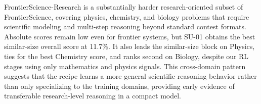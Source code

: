 \documentclass{llmxive}
\providecommand{\arraystretch}{1.14}
\begin{document}
FrontierScience-Research is a substantially harder research-oriented subset of
FrontierScience, covering physics, chemistry, and biology problems that require
scientific modeling and multi-step reasoning beyond standard contest formats.
Absolute scores remain low even for frontier systems, but SU-01 obtains the
best similar-size overall score at 11.7\%. It also leads the
similar-size block on Physics, ties for the best Chemistry score, and ranks
second on Biology, despite our RL stages using only mathematics and physics
signals. This cross-domain pattern suggests that the recipe learns a more
general scientific reasoning behavior rather than only specializing to the
training domains, providing early evidence of transferable research-level
reasoning in a compact model.

\begin{table}[t]
\centering
\vspace{-5 pt}
\setlength{\tabcolsep}{2.4pt}
\renewcommand{\arraystretch}{1.12}
\small
{}
\end{table}
\end{document}
